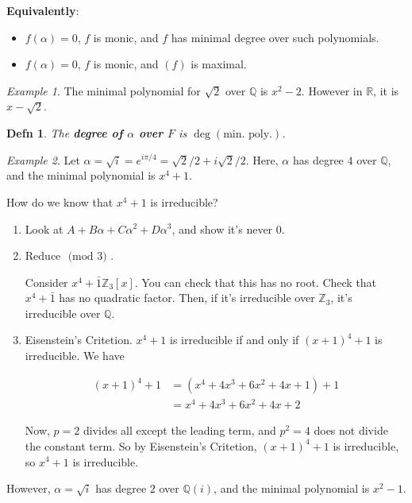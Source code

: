 \documentclass[12pt]{article}
\def\Z{{\mathbb Z}}
\def\Q{{\mathbb Q}}
\def\R{{\mathbb R}}
\renewcommand{\mod}[1]{\text{ (mod $#1$) }}
\newtheorem{definition}{Defn}
\theoremstyle{remark}
\theoremstyle{remark}
\theoremstyle{remark}
\newtheorem{example}{Example}
\theoremstyle{remark}
\theoremstyle{remark}
\begin{document}
{\bf Equivalently}: 
\begin{itemize}
  \item $f(\alpha) = 0$, $f$ is monic, and $f$ has minimal degree over such polynomials.
  \item $f(\alpha) = 0$, $f$ is monic, and $(f)$ is maximal.
\end{itemize}

\begin{example}
  The minimal polynomial for $\sqrt{2}$ over $\Q$ is $x^2 - 2$. However in $\R$,
  it is $x - \sqrt{2}$.
\end{example}

\begin{definition}
  The {\bf degree of $\alpha$ over $F$} is $\deg(\text{min. poly.})$.
\end{definition}

\begin{example}
  Let $\alpha = \sqrt{i} = e^{i \pi / 4} = \sqrt{2} / 2 + i \sqrt{2} / 2$. Here,
  $\alpha$ has degree $4$ over $\Q$, and the minimal polynomial is $x^4 + 1$.

  How do we know that $x^4 + 1$ is irreducible?
  \begin{enumerate}
    \item Look at $A + B \alpha + C \alpha^2 + D \alpha^3$, and show it's never
      $0$.
    \item Reduce $\mod 3$.

      Consider $x^4 + \bar 1 \Z_3[x]$. You can check that this has no root.
      Check that $x^4 + \bar 1$ has no quadratic factor. Then, if it's
      irreducible over $\Z_3$, it's irreducible over $\Q$.

    \item Eisenstein's Critetion. $x^4 + 1$ is irreducible if and only if $(x +
      1)^4 + 1$ is irreducible. We have

      \begin{align*}
        (x + 1)^4 + 1 &= (x^4 + 4x^3 + 6x^2 + 4x + 1) + 1 \\
                      &= x^4 + 4x^3 + 6x^2 + 4x + 2
      \end{align*}

      Now, $p = 2$ divides all except the leading term, and $p^2 = 4$ does not
      divide the constant term. So by Eisenstein's Critetion, $(x + 1)^4 + 1$ is
      irreducible, so $x^4 + 1$ is irreducible.
  \end{enumerate}

  However, $\alpha = \sqrt{i}$ has degree $2$ over $\Q(i)$, and the minimal
  polynomial is $x^2 - 1$.
\end{example}
\end{document}

